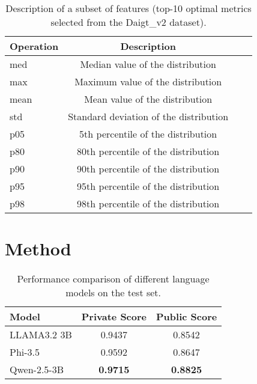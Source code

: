 \begin{table}[t]
\caption{Description of a subset of features (top-10 optimal metrics selected from the Daigt\_v2 dataset). }
\label{operation}
\vskip 0.15in
\begin{center}
\begin{small}
\begin{tabular}{lccr}
\toprule
\textbf{Operation} & \textbf{Description} \\ \midrule
med & Median value of the distribution \\
max & Maximum value of the distribution \\
mean & Mean value of the distribution \\
std & Standard deviation of the distribution \\
p05 & 5th percentile of the distribution \\
p80 & 80th percentile of the distribution \\
p90 & 90th percentile of the distribution \\
p95 & 95th percentile of the distribution \\
p98 & 98th percentile of the distribution \\ \bottomrule
\end{tabular}
\end{small}
\end{center}
\vskip -0.1in
\end{table}

\section{Method}
\label{Method}

\begin{table}[t]
\caption{Performance comparison of different language models on the test set.}
\label{model_performance}
\vskip 0.15in
\begin{center}
\begin{small}
\begin{tabular}{lcc}
\toprule
\textbf{Model} & \textbf{Private Score} & \textbf{Public Score} \\
\midrule
LLAMA3.2 3B & 0.9437 & 0.8542 \\
Phi-3.5 & 0.9592 & 0.8647 \\
Qwen-2.5-3B & \textbf{0.9715} & \textbf{0.8825} \\
\bottomrule
\end{tabular}
\end{small}
\end{center}
\vskip -0.1in
\end{table}


